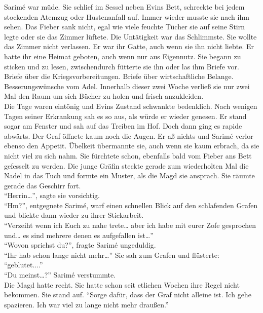 Sarimé war müde. Sie schlief im Sessel neben Evins Bett, schreckte bei jedem stockenden Atemzug 
oder Hustenanfall auf. Immer wieder musste sie nach ihm sehen. Das Fieber sank nicht, egal wie 
viele feuchte Tücher sie auf seine Stirn legte oder sie das Zimmer lüftete. Die Untätigkeit war das 
Schlimmste. Sie wollte das Zimmer nicht verlassen. Er war ihr Gatte, auch wenn sie ihn nicht 
liebte. Er hatte ihr eine Heimat geboten, auch wenn nur aus Eigennutz. Sie begann zu sticken und zu 
lesen, zwischendurch fütterte sie ihn oder las ihm Briefe vor. Briefe über die Kriegsvorbereitungen. 
Briefe über wirtschaftliche Belange. Besserungswünsche vom Adel. Innerhalb dieser zwei Woche verließ 
sie nur zwei Mal den Raum um sich Bücher zu holen und frisch anzukleiden.\\
Die Tage waren eintönig und Evins Zustand schwankte bedenklich. Nach wenigen Tagen seiner 
Erkrankung sah es so aus, als würde er wieder genesen. Er stand sogar am Fenster und sah auf das 
Treiben im Hof. Doch dann ging es rapide abwärts. Der Graf öffnete kaum noch die Augen. Er aß nichts 
und Sarimé verlor ebenso den Appetit. Übelkeit übermannte sie, auch wenn sie kaum erbrach, da sie 
nicht viel zu sich nahm. Sie fürchtete schon, ebenfalls bald vom Fieber ans Bett gefesselt zu 
werden. Die junge Gräfin steckte gerade zum wiederholten Mal die Nadel in das Tuch und formte ein 
Muster, als die Magd sie ansprach. Sie räumte gerade das Geschirr fort. \\
``Herrin…'', sagte sie vorsichtig.\\
``Hm?'', entgegnete Sarimé, warf einen schnellen Blick auf den schlafenden Grafen und blickte dann 
wieder zu ihrer Stickarbeit.\\
``Verzeiht wenn ich Euch zu nahe trete… aber ich habe mit eurer Zofe gesprochen und… es sind 
mehrere denen es aufgefallen ist…''\\
``Wovon sprichst du?'', fragte Sarimé ungeduldig.\\
``Ihr hab schon lange nicht mehr…'' Sie sah zum Grafen und flüsterte: ``geblutet....''\\
``Du meinst…?'' Sarimé verstummte.\\
Die Magd hatte recht. Sie hatte schon seit etlichen Wochen ihre Regel nicht bekommen. Sie stand 
auf. ``Sorge dafür, dass der Graf nicht alleine ist. Ich gehe spazieren. Ich war viel zu lange 
nicht mehr draußen.''\\

